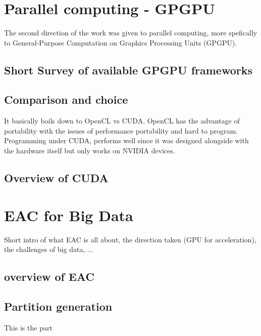\documentclass[10pt,a4paper,final]{article}
\begin{document}
\section{Parallel computing - GPGPU}
The second direction of the work was given to parallel computing, more spefically to General-Purpose Computation on Graphics Processing Units (GPGPU). 

\subsection{Short Survey of available GPGPU frameworks}


\subsection{Comparison and choice}
It basically boils down to OpenCL vs CUDA. OpenCL has the advantage of portability with the issues of performance portability and hard to program. Programming under CUDA, performs well since it was designed alongside with the hardware itself but only works on NVIDIA devices.

\subsection{Overview of CUDA}




\section{EAC for Big Data}
Short intro of what EAC is all about, the direction taken (GPU for acceleration), the challenges of big data, ...

\subsection{overview of EAC}

\subsection{Partition generation}
This is the part 



\end{document}
